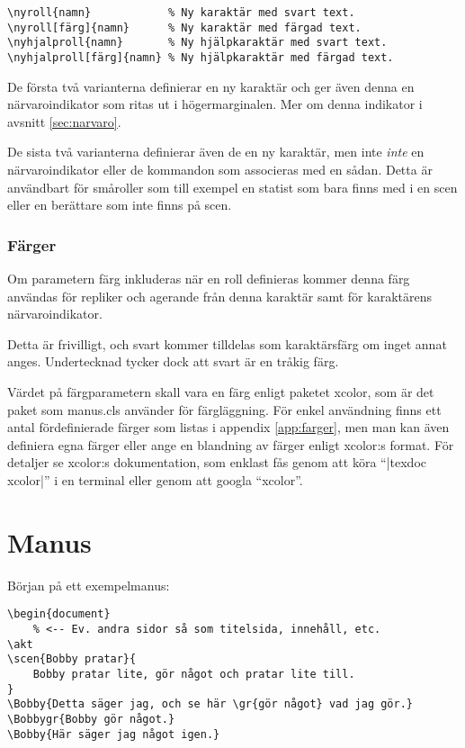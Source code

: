 \documentclass[a4paper,12pt]{article}
\newcommand*{\pack}{\textsf}
\begin{document}
\begin{lstlisting}
\nyroll{namn}            % Ny karaktär med svart text.
\nyroll[färg]{namn}      % Ny karaktär med färgad text.
\nyhjalproll{namn}       % Ny hjälpkaraktär med svart text.
\nyhjalproll[färg]{namn} % Ny hjälpkaraktär med färgad text.
\end{lstlisting}

De första två varianterna definierar en ny karaktär och ger även denna en närvaroindikator som ritas ut i högermarginalen. Mer om denna indikator i avsnitt \ref{sec:narvaro}.

De sista två varianterna definierar även de en ny karaktär, men inte \emph{inte} en närvaroindikator eller de kommandon som associeras med en sådan. Detta är användbart för småroller som till exempel en statist som bara finns med i en scen eller en berättare som inte finns på scen.

\subsubsection{Färger}
\label{sec:farger}
Om parametern färg inkluderas när en roll definieras kommer denna färg användas för repliker och agerande från denna karaktär samt för karaktärens närvaroindikator.

Detta är frivilligt, och svart kommer tilldelas som karaktärsfärg om inget annat anges. Undertecknad tycker dock att svart är en tråkig färg.

Värdet på färgparametern skall vara en färg enligt paketet \pack{xcolor}, som är det paket som \pack{manus.cls} använder för färgläggning. För enkel användning finns ett antal fördefinierade färger som listas i appendix \ref{app:farger}, men man kan även definiera egna färger eller ange en blandning av färger enligt \pack{xcolor}:s format. För detaljer se \pack{xcolor}:s dokumentation, som enklast fås genom att köra ``|texdoc xcolor|'' i en terminal eller genom att googla ``xcolor''.



\newpage

\section{Manus}
Början på ett exempelmanus:

\begin{lstlisting}
\begin{document}
	% <-- Ev. andra sidor så som titelsida, innehåll, etc.
\akt
\scen{Bobby pratar}{
	Bobby pratar lite, gör något och pratar lite till.
}
\Bobby{Detta säger jag, och se här \gr{gör något} vad jag gör.}
\Bobbygr{Bobby gör något.}
\Bobby{Här säger jag något igen.}
\end{lstlisting}
\end{document}
